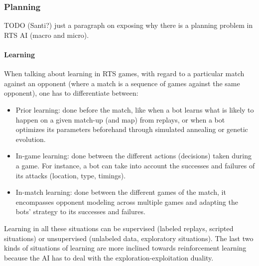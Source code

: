 \documentclass[journal]{IEEEtran}
\begin{document}
\subsubsection{Planning}
{\color{blue}
TODO (Santi?) just a paragraph on exposing why there is a planning problem in RTS AI (macro and micro).


\paragraph{Learning}
When talking about learning in RTS games, with regard to a particular match against an opponent (where a match is a sequence of games against the same opponent), one has to differentiate between:
\begin{itemize}
\item Prior learning: done before the match, like when a bot learns what is likely to happen on a given match-up (and map) from replays, or when a bot optimizes its parameters beforehand through simulated annealing or genetic evolution.
\item In-game learning: done between the different actions (decisions) taken during a game. For instance, a bot can take into account the successes and failures of its attacks (location, type, timings).
\item In-match learning: done between the different games of the match, it encompasses opponent modeling across multiple games and adapting the bots' strategy to its successes and failures.
\end{itemize}
Learning in all these situations can be supervised (labeled replays, scripted situations) or unsupervised (unlabeled data, exploratory situations). The last two kinds of situations of learning are more inclined towards reinforcement learning because the AI has to deal with the exploration-exploitation duality. %


}
\end{document}
